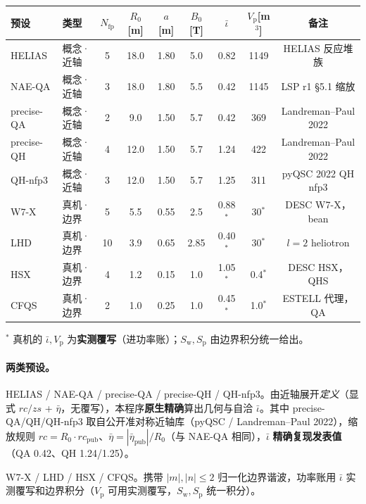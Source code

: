 \documentclass[UTF8,11pt]{ctexart}
\newcommand{\Vp}{V_\mathrm{p}}
\newcommand{\Sw}{S_\mathrm{w}}
\newcommand{\Sp}{S_\mathrm{p}}
\newcommand{\nfp}{N_\mathrm{fp}}
\newcommand{\iotabar}{\bar{\iota}}
\newcommand{\etabar}{\bar\eta}
\begin{document}
\begin{center}
\renewcommand{\arraystretch}{1.25}
\begin{tabular}{@{}llccccccc@{}}
\toprule
预设 & 类型 & $\nfp$ & $R_0$[m] & $a$[m] & $B_0$[T] & $\iotabar$ & $\Vp$[m$^3$] & 备注 \\
\midrule
HELIAS     & 概念·近轴 & 5 & 18.0 & 1.80 & 5.0 & 0.82 & 1149 & HELIAS 反应堆族 \\
NAE-QA     & 概念·近轴 & 3 & 18.0 & 1.80 & 5.5 & 0.42 & 1145 & LSP r1 §5.1 缩放 \\
precise-QA & 概念·近轴 & 2 & 9.0  & 1.50 & 5.7 & 0.42 & 369  & Landreman--Paul 2022 \\
precise-QH & 概念·近轴 & 4 & 12.0 & 1.50 & 5.7 & 1.24 & 422  & Landreman--Paul 2022 \\
QH-nfp3    & 概念·近轴 & 3 & 12.0 & 1.50 & 5.7 & 1.25 & 311  & pyQSC 2022 QH nfp3 \\
\midrule
W7-X       & 真机·边界 & 5 & 5.5  & 0.55 & 2.5 & 0.88$^{*}$ & 30$^{*}$  & DESC W7-X，bean \\
LHD        & 真机·边界 & 10& 3.9  & 0.65 & 2.85& 0.40$^{*}$ & 30$^{*}$  & $l{=}2$ heliotron \\
HSX        & 真机·边界 & 4 & 1.2  & 0.15 & 1.0 & 1.05$^{*}$ & 0.4$^{*}$ & DESC HSX，QHS \\
CFQS       & 真机·边界 & 2 & 1.0  & 0.25 & 1.0 & 0.45$^{*}$ & 1.0$^{*}$ & ESTELL 代理，QA \\
\bottomrule
\end{tabular}
\end{center}
\footnotesize $^{*}$ 真机的 $\iotabar,\Vp$ 为\textbf{实测覆写}（进功率账）；$\Sw,\Sp$ 由边界积分统一给出。\normalsize

\paragraph{两类预设。}
\begin{description}[leftmargin=1.2em,style=nextline]
\item[概念堆（近轴定义）] HELIAS / NAE-QA / precise-QA / precise-QH / QH-nfp3。由近轴展开\emph{定义}（显式 $rc/zs$ + $\etabar$，无覆写），本程序\textbf{原生精确}算出几何与自洽 $\iotabar$。其中 precise-QA/QH/QH-nfp3 取自公开准对称近轴库（pyQSC / Landreman--Paul 2022），缩放规则 $rc=R_0\cdot rc_\mathrm{pub}$、$\etabar=|\etabar_\mathrm{pub}|/R_0$（与 NAE-QA 相同），$\iotabar$ \textbf{精确复现发表值}（QA 0.42、QH 1.24/1.25）。
\item[真机（边界谐波）] W7-X / LHD / HSX / CFQS。携带 $|m|,|n|\le2$ 归一化边界谐波，功率账用 $\iotabar$ 实测覆写和边界积分（$\Vp$ 可用实测覆写，$\Sw,\Sp$ 统一积分）。
\end{description}
\end{document}
